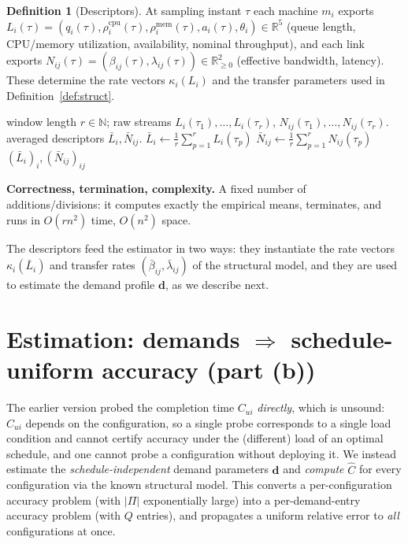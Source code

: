 \documentclass{amsart}
\theoremstyle{definition}
\newtheorem{definition}{Definition}
\newcommand{\Chat}{\widehat{C}}
\begin{document}
\begin{definition}[Descriptors]\label{def:descriptors}
At sampling instant $\tau$ each machine $m_i$ exports
$L_i(\tau)=(q_i(\tau),\rho^{\mathrm{cpu}}_i(\tau),\rho^{\mathrm{mem}}_i(\tau),
a_i(\tau),\theta_i)\in\mathbb{R}^5$ (queue length, CPU/memory utilization,
availability, nominal throughput), and each link exports
$N_{ij}(\tau)=(\beta_{ij}(\tau),\lambda_{ij}(\tau))\in\mathbb{R}^2_{\ge0}$
(effective bandwidth, latency). These determine the rate vectors $\kappa_i(L_i)$
and the transfer parameters used in Definition~\ref{def:struct}.
\end{definition}

\begin{algorithm}[h]
\caption{ComputeDescriptors}\label{alg:descr}
\begin{algorithmic}[1]
\Require window length $r\in\mathbb N$; raw streams $L_i(\tau_1),\dots,L_i(\tau_r)$, $N_{ij}(\tau_1),\dots,N_{ij}(\tau_r)$.
\Ensure averaged descriptors $\bar L_i,\bar N_{ij}$.
  \State $\bar L_i\gets\frac1r\sum_{p=1}^r L_i(\tau_p)$
   \State $\bar N_{ij}\gets\frac1r\sum_{p=1}^r N_{ij}(\tau_p)$ \EndFor
\EndFor
\State \Return $(\bar L_i)_i,(\bar N_{ij})_{ij}$
\end{algorithmic}
\end{algorithm}

\noindent\textbf{Correctness, termination, complexity.} A fixed number of
additions/divisions: it computes exactly the empirical means, terminates, and
runs in $O(rn^2)$ time, $O(n^2)$ space.

The descriptors feed the estimator in two ways: they instantiate the rate
vectors $\kappa_i(\bar L_i)$ and transfer rates $(\bar\beta_{ij},\bar\lambda_{ij})$
of the structural model, and they are used to estimate the demand profile
$\mathbf d$, as we describe next.

\section{Estimation: demands $\Rightarrow$ schedule-uniform accuracy (part (b))}\label{sec:estimate}

The earlier version probed the completion time $C_{ui}$ \emph{directly}, which is
unsound: $C_{ui}$ depends on the configuration, so a single probe corresponds to
a single load condition and cannot certify accuracy under the (different) load
of an optimal schedule, and one cannot probe a configuration without deploying
it. We instead estimate the \emph{schedule-independent} demand parameters
$\mathbf d$ and \emph{compute} $\Chat$ for every configuration via the known
structural model. This converts a per-configuration accuracy problem (with
$|\Pi|$ exponentially large) into a per-demand-entry accuracy problem (with $Q$
entries), and propagates a uniform relative error to \emph{all} configurations
at once.
\end{document}
